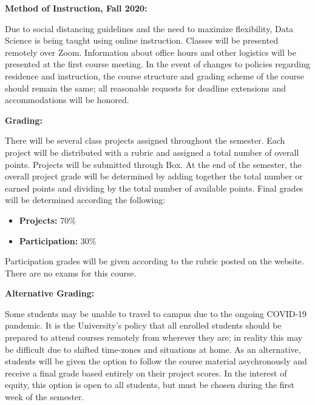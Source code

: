 \documentclass[12pt, a4paper]{article}
\begin{document}
\textbf{Method of Instruction, Fall 2020:} \vspace{6pt}

Due to social distancing guidelines and the need to maximize flexibility, Data Science is
being taught using online instruction. Classes will be presented remotely over Zoom.
Information about office hours and other logistics will be presented at the first course
meeting. In the event of changes to policies regarding residence and instruction, the
course structure and grading scheme of the course should remain the same; all reasonable
requests for deadline extensions and accommodations will be honored.

\bigskip

\textbf{Grading:} \vspace{6pt}

There will be several class projects assigned throughout the semester. Each project will be
distributed with a rubric and assigned a total number of overall points. Projects will be
submitted through Box. At the end of the semester, the overall project grade will be
determined by adding together the total number or earned points and dividing by the total
number of available points. Final grades will be determined according the following:

\begin{itemize}\setlength\itemsep{0em}
  \item \textbf{Projects:} 70\%
  \item \textbf{Participation:} 30\%
\end{itemize}

Participation grades will be given according to the rubric posted on the website.
There are no exams for this course.

\bigskip

\textbf{Alternative Grading:} \vspace{6pt}

Some students may be unable to travel to campus due to the ongoing COVID-19 pandemic. It is
the University's policy that all enrolled students should be prepared to attend courses
remotely from wherever they are; in reality this may be difficult due to shifted
time-zones and situations at home. As an alternative, students will be given the option to
follow the course material asychronously and receive a final grade based entirely on their
project scores. In the interest of equity, this option is open to all students, but must be
chosen during the first week of the semester.
\end{document}
